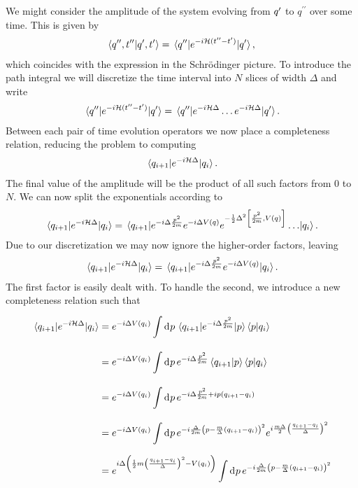 We might consider the amplitude of the system evolving from $q^{\prime}$ to $q^{\prime\prime}$ over some time. This is given by
\begin{align*}
	\braket{q^{\prime\prime}, t^{\prime\prime}}{q^{\prime}, t^{\prime}} = \mel{q^{\prime\prime}}{e^{-i\ensuremath{\mathcal{H}}(t^{\prime\prime} - t\ensuremath{^{\prime}})}}{q\ensuremath{^{\prime}}},
\end{align*}
which coincides with the expression in the Schrödinger picture. To introduce the path integral we will discretize the time interval into $N$ slices of width $\Delta$ and write
\begin{align*}
	\mel{q^{\prime\prime}}{e^{-i\ensuremath{\mathcal{H}}(t^{\prime\prime} - t\ensuremath{^{\prime}})}}{q\ensuremath{^{\prime}}} = \mel{q^{\prime\prime}}{e^{-i\ensuremath{\mathcal{H}}\Delta}\dots e^{-i\ensuremath{\mathcal{H}}\Delta}}{q\ensuremath{^{\prime}}}.
\end{align*}
Between each pair of time evolution operators we now place a completeness relation, reducing the problem to computing
\begin{align*}
	\mel{q_{i + 1}}{e^{-i\ensuremath{\mathcal{H}}\Delta}}{q_{i}}.
\end{align*}
The final value of the amplitude will be the product of all such factors from $0$ to $N$. We can now split the exponentials according to
\begin{align*}
	\mel{q_{i + 1}}{e^{-i\ham\Delta}}{q_{i}} = \mel{q_{i + 1}}{e^{-i\Delta\frac{p^{2}}{2m}}e^{-i\Delta V(q)}e^{-\frac{1}{2}\Delta^{2}\comm{\frac{p^{2}}{2m}}{V(q)}}\dots}{q_{i}}.
\end{align*}
Due to our discretization we may now ignore the higher-order factors, leaving
\begin{align*}
	\mel{q_{i + 1}}{e^{-i\ensuremath{\mathcal{H}}\Delta}}{q_{i}} = \mel{q_{i + 1}}{e^{-i\Delta\frac{p^{2}}{2m}}e^{-i\Delta V(q)}}{q_{i}}.
\end{align*}
The first factor is easily dealt with. To handle the second, we introduce a new completeness relation such that
\begin{align*}
	\mel{q_{i + 1}}{e^{-i\ensuremath{\mathcal{H}}\Delta}}{q_{i}} &= e^{-i\Delta V(q_{i})}\int\limits_{}^{}\dd[]{p}\mel{q_{i + 1}}{e^{-i\Delta\frac{p^{2}}{2m}}}{p}\braket{p}{q_{i}} \\
	                                         &= e^{-i\Delta V(q_{i})}\int\limits_{}^{}\dd[]{p}e^{-i\Delta\frac{p^{2}}{2m}}\braket{q_{i + 1}}{p}\braket{p}{q_{i}} \\
	                                         &= e^{-i\Delta V(q_{i})}\int\limits_{}^{}\dd[]{p}e^{-i\Delta\frac{p^{2}}{2m} + ip(q_{i + 1} - q_{i})} \\
	                                         &= e^{-i\Delta V(q_{i})}\int\limits_{}^{}\dd[]{p}e^{-i\frac{\Delta}{2m}\left(p - \frac{m}{\Delta}(q_{i + 1} - q_{i})\right)^{2}}e^{i\frac{m\Delta}{2}\left(\frac{q_{i + 1} - q_{i}}{\Delta}\right)^{2}} \\
	                                         &= e^{i\Delta\left(\frac{1}{2}m\left(\frac{q_{i + 1} - q_{i}}{\Delta}\right)^{2} - V(q_{i})\right)}\int\limits_{}^{}\dd[]{p}e^{-i\frac{\Delta}{2m}\left(p - \frac{m}{\Delta}(q_{i + 1} - q_{i})\right)^{2}}
\end{align*}
